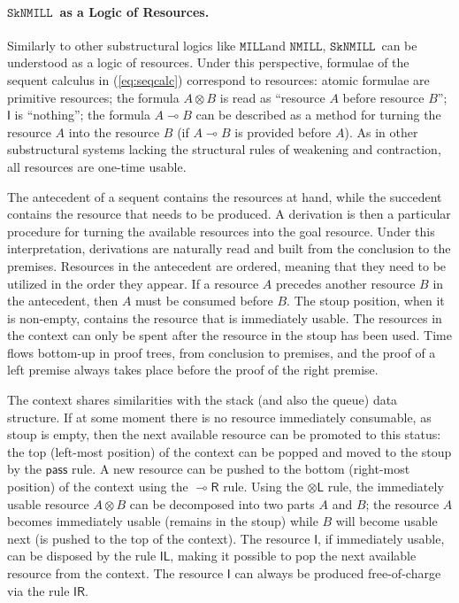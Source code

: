 \documentclass[copyright,creativecommons]{eptcs}
\theoremstyle{definition}
\newcommand{\tl}{\otimes \mathsf{L}}
\newcommand{\lright}{{\multimap}\mathsf{R}}
\newcommand{\pass}{\mathsf{pass}}
\newcommand{\unitl}{\mathsf{IL}}
\newcommand{\unitr}{\mathsf{IR}}
\newcommand{\ot}{\otimes}
\newcommand{\lolli}{\multimap}
\newcommand{\I}{\mathsf{I}}
\newcommand{\MILL}{$\mathtt{MILL}$}
\newcommand{\NMILL}{$\mathtt{NMILL}$}
\newcommand{\SkNMILL}{$\mathtt{SkNMILL}$}
\begin{document}

\paragraph{\SkNMILL\ as a Logic of Resources.}

Similarly to other substructural logics like \MILL and \NMILL, \SkNMILL\ can be understood
as a logic of resources. Under this perspective, formulae of the
sequent calculus in (\ref{eq:seqcalc}) correspond to
resources: atomic formulae are primitive resources; the formula $A \ot
B$ is read as ``resource $A$ before resource $B$''; $\I$ is ``nothing''; the formula $A \lolli B$
can be described as a method for turning the resource $A$ into the
resource $B$ (if $A \lolli B$ is provided before $A$). As in other substructural systems lacking the structural
rules of weakening and contraction, all resources are one-time
usable.

The antecedent of a sequent contains the resources at hand, while the
succedent contains the resource that needs to be produced. A
derivation is then a particular procedure for turning the available
resources into the goal resource. Under this interpretation,
derivations are naturally read and built from the conclusion to the
premises. Resources in the antecedent are ordered, meaning that they
need to be utilized in the order they appear. If a resource $A$
precedes another resource $B$ in the antecedent, then
$A$ must be consumed before $B$. The stoup position, when it is
non-empty, contains the resource that is immediately usable. The
resources in the context can only be spent after the resource in the stoup has been used. Time flows
bottom-up in proof trees, from conclusion to premises, and the proof
of a left premise always takes place before the proof of the right
premise.

The context shares similarities with the stack (and also the queue) data
structure. If at some moment there is no resource immediately consumable, as stoup is empty, then the
next available resource can be promoted to this status: the top (left-most position) of the context
can be popped and moved to the
stoup by the $\pass$ rule. A new resource can be pushed to the bottom (right-most
position) of the context using the $\lright$ rule. Using the $\tl$
rule, the immediately usable resource $A \ot B$ can be decomposed into two parts $A$ and $B$; the resource $A$ becomes immediately usable (remains in the stoup) while $B$ will become usable next (is pushed to the top of the context).  The resource $\I$, if immediately usable, can be disposed by the rule $\unitl$, making it possible to pop the next available
resource from the context. The resource $\I$ can always be produced
free-of-charge via the rule $\unitr$.
\end{document}
